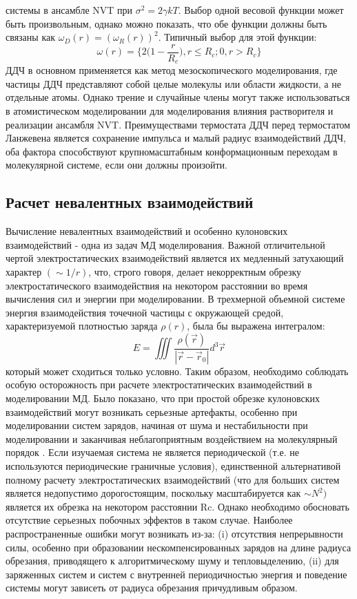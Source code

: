 системы в ансамбле NVT при $\sigma^2 = 2\gamma kT$. Выбор одной весовой функции может
быть произвольным, однако можно показать, что обе функции должны быть связаны как
$\omega_D (r) = (\omega_R (r))^2$.
Типичный выбор для этой функции:
\begin{equation}
    \omega (r)= \Bigg\{ 2 \bigg(1- \frac{r}{R_c}    \bigg), r \leq R_c  ;   0, r > R_c\Bigg\}
\end{equation}
ДДЧ в основном применяется как метод мезоскопического моделирования, где частицы ДДЧ представляют собой целые молекулы или области жидкости, а не отдельные атомы. Однако трение и случайные члены могут также использоваться в атомистическом моделировании для моделирования влияния растворителя и реализации ансамбля NVT. Преимуществами термостата ДДЧ перед термостатом Ланжевена является сохранение импульса и малый радиус взаимодействий ДДЧ, оба фактора способствуют крупномасштабным конформационным переходам в молекулярной системе, если они должны произойти.

\subsection{Расчет невалентных взаимодействий}
    Вычисление невалентных взаимодействий и особенно кулоновских взаимодействий - одна из задач МД моделирования. Важной отличительной чертой электростатических взаимодействий является их медленный затухающий характер $(\sim 1/r)$, что, строго говоря, делает некорректным обрезку электростатического взаимодействия на некотором расстоянии во время вычисления сил и энергии при моделировании. В трехмерной объемной системе энергия взаимодействия точечной частицы с окружающей средой, характеризуемой плотностью заряда $\rho (r)$, была бы выражена интегралом:
\begin{equation}
   E= \iiint \frac{\rho (\vec{r})}{|\vec{r}- \vec{r}_0|} d^3 \vec{r}
\end{equation}
    который может сходиться только условно. Таким образом, необходимо соблюдать особую осторожность при расчете электростатических взаимодействий в моделировании МД. Было показано, что при простой обрезке кулоновских взаимодействий могут возникать серьезные артефакты, особенно при моделировании систем зарядов, начиная от шума и нестабильности при моделировании и заканчивая неблагоприятным воздействием на молекулярный порядок \cite{sagui_molecular_1999}.
    Если изучаемая система не является периодической (т.е. не используются периодические граничные условия), единственной альтернативой полному расчету электростатических взаимодействий (что для больших систем является недопустимо дорогостоящим, поскольку масштабируется как $\sim N^2)$ является их обрезка на некотором расстоянии Rc. Однако необходимо обосновать отсутствие серьезных побочных эффектов в таком случае. Наиболее распространенные ошибки могут возникать из-за: (i) отсутствия непрерывности силы, особенно при образовании нескомпенсированных зарядов на длине радиуса обрезания, приводящего к алгоритмическому шуму и тепловыделению, (ii) для заряженных систем и систем с внутренней периодичностью энергия и поведение системы могут зависеть от радиуса обрезания причудливым образом.
    
